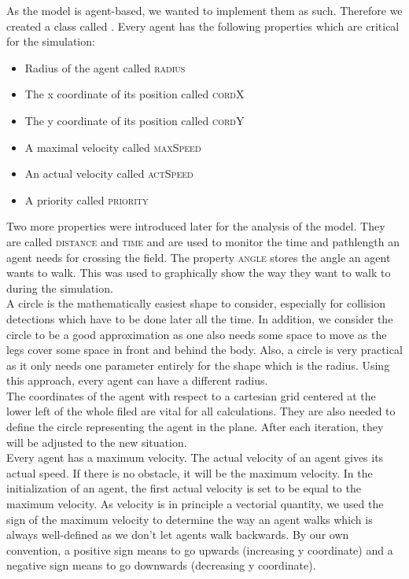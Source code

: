 
As the model is agent-based, we wanted to implement them as such. Therefore we created a class called . Every agent has the following properties which are critical for the simulation:
\begin{itemize}
	\item Radius of the agent called \textsc{radius}
	\item The x coordinate of its position called \textsc{cordX}
	\item The y coordinate of its position called \textsc{cordY}
	\item A maximal velocity called \textsc{maxSpeed}
	\item An actual velocity called \textsc{actSpeed}
	\item A priority called \textsc{priority}
\end{itemize}
\noi Two more properties were introduced later for the analysis of the model. They are called \textsc{distance} and \textsc{time} and are used to monitor the time and pathlength an agent needs for crossing the field. The property \textsc{angle} stores the angle an agent wants to walk. This was used to graphically show the way they want to walk to during the simulation.\\

\noi A circle is the mathematically easiest shape to consider, especially for collision detections which have to be done later all the time. In addition, we consider the circle to be a good approximation as one also needs some space to move as the legs cover some space in front and behind the body. Also, a circle is very practical as it only needs one parameter entirely for the shape which is the radius. Using this approach, every agent can have a different radius.\\

\noi The coordinates of the agent with respect to a cartesian grid centered at the lower left of the whole filed are vital for all calculations. They are also needed to define the circle representing the agent in the plane. After each iteration, they will be adjusted to the new situation.\\

\noi Every agent has a maximum velocity. The actual velocity of an agent gives its actual speed. If there is no obstacle, it will be the maximum velocity. In the initialization of an agent, the first actual velocity is set to be equal to the maximum velocity. As velocity is in principle a vectorial quantity, we used the sign of the maximum velocity to determine the way an agent walks which is always well-defined as we don't let agents walk backwards. By our own convention, a positive sign means to go upwards (increasing y coordinate) and a negative sign means to go downwards (decreasing y coordinate).\\

